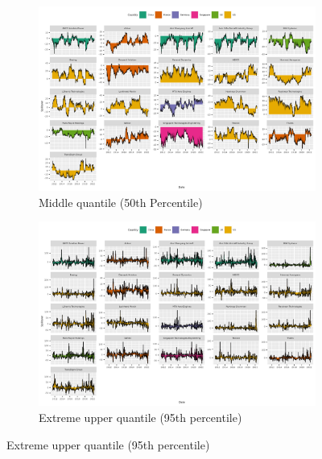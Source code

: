 \documentclass[
  letterpaper,
  DIV=11,
  numbers=noendperiod]{scrartcl}
\begin{document}
\begin{figure}

{\centering 

\begin{figure}[H]

{\centering \includegraphics[width=6.75in,height=\textheight]{plots/fig-rtnnet50.png}

}

\caption{Middle quantile (50th Percentile)}

\end{figure}

\begin{figure}[H]

{\centering \includegraphics[width=6.75in,height=\textheight]{plots/fig-rtnnet95.png}

}

\caption{Extreme upper quantile (95th percentile)}


\end{figure}}
\end{figure}
\end{document}
